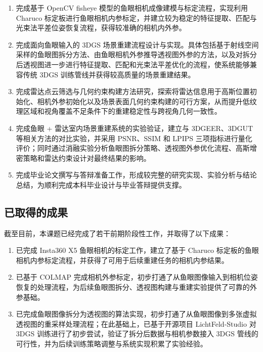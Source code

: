 \begin{enumerate}
    \item 完成基于 OpenCV fisheye 模型的鱼眼相机成像建模与标定流程，实现利用 Charuco 标定板进行鱼眼相机内参标定，并建立较为稳定的特征提取、匹配与光束法平差位姿恢复流程，获得较准确的相机内外参。

    \item 完成面向鱼眼输入的 3DGS 场景重建流程设计与实现。具体包括基于射线空间采样的鱼眼图拆分方法、由鱼眼相机外参推导透视图外参的方法，以及对拆分后透视图进一步进行特征提取、匹配和光束法平差优化的流程，使系统能够兼容传统 3DGS 训练管线并获得较高质量的场景重建结果。

    \item 完成雷达点云筛选与几何约束构建方法研究，探索将雷达信息用于高斯位置初始化、相机外参初始化以及场景表面几何约束构建的可行方案，从而提升低纹理区域和视角覆盖不足条件下的重建稳定性与跨视角几何一致性。

    \item 完成鱼眼 + 雷达室内场景重建系统的实验验证，建立与 3DGEER、3DGUT 等相关方法的对比实验，并采用 PSNR、SSIM 和 LPIPS 三项指标进行量化评价；同时通过消融实验分析鱼眼图拆分策略、透视图外参优化流程、高斯增密策略和雷达约束设计对最终结果的影响。

    \item 完成毕业论文撰写与答辩准备工作，形成较完整的研究实现、实验分析与结论总结，为顺利完成本科毕业设计与毕业答辩提供支撑。
\end{enumerate}

\subsection{已取得的成果}

截至目前，本课题已经完成了若干前期阶段性工作，并取得了以下成果：

\begin{enumerate}
    \item 已完成 Insta360 X5 鱼眼相机的标定工作，建立了基于 Charuco 标定板的鱼眼相机内参标定流程，并获得了可用于后续重建任务的相机内参结果。

    \item 已基于 COLMAP 完成相机外参标定，初步打通了从鱼眼图像输入到相机位姿恢复的处理流程，为后续鱼眼图拆分、透视图构建与重建实验提供了可靠的外参基础。

    \item 已完成鱼眼图像拆分为透视图的算法实现，初步打通了从鱼眼图像到多张虚拟透视图的重采样处理流程；在此基础上，已基于开源项目 LichtFeld-Studio 对 3DGS 训练进行了初步尝试，验证了拆分后数据与相机参数接入 3DGS 管线的可行性，并为后续训练策略调整与系统实现积累了实验经验。
\end{enumerate}
